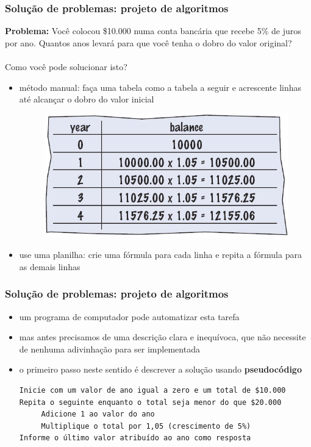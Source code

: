 \documentclass[aspectratio=169]{beamer}
\begin{document}
\begin{frame}\frametitle{Solução de problemas: projeto de algoritmos}
\textbf{Problema:} Você colocou \$10.000 numa conta bancária que recebe 5\% de juros por ano. Quantos anos levará para que você tenha o dobro do valor original?\\
~\\
Como você pode solucionar isto?
\begin{itemize}
	\item método manual: faça uma tabela como a tabela a seguir e acrescente linhas até alcançar o dobro do valor inicial
	\begin{figure}[h]
		\centering
		\includegraphics[height=0.25\paperheight]{pucrs-ep-fprog-unidade_01-introducao-laminas-investimento.jpg}
	\end{figure}
	\item use uma planilha: crie uma fórmula para cada linha e repita a fórmula para as demais linhas
\end{itemize}
\end{frame}

\begin{frame}[fragile]\frametitle{Solução de problemas: projeto de algoritmos}
\begin{itemize}
	\item um programa de computador pode automatizar esta tarefa
	\item mas antes precisamos de uma descrição clara e inequívoca, que não necessite de nenhuma adivinhação para ser implementada
	\item o primeiro passo neste sentido é descrever a solução usando \textbf{pseudocódigo}
\begin{verbatim}
Inicie com um valor de ano igual a zero e um total de $10.000
Repita o seguinte enquanto o total seja menor do que $20.000
     Adicione 1 ao valor do ano
     Multiplique o total por 1,05 (crescimento de 5%)
Informe o último valor atribuído ao ano como resposta
\end{verbatim}
\end{itemize}
\end{frame}
\end{document}
